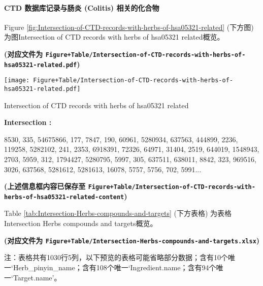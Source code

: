 \documentclass[
]{article}
\begin{document}
\hypertarget{ctd-ux6570ux636eux5e93ux8bb0ux5f55ux4e0eux80a0ux708e-colitis-ux76f8ux5173ux7684ux5316ux5408ux7269}{%
\paragraph{CTD 数据库记录与肠炎 (Colitis) 相关的化合物}\label{ctd-ux6570ux636eux5e93ux8bb0ux5f55ux4e0eux80a0ux708e-colitis-ux76f8ux5173ux7684ux5316ux5408ux7269}}

Figure \ref{fig:Intersection-of-CTD-records-with-herbs-of-hsa05321-related} (下方图) 为图Intersection of CTD records with herbs of hsa05321 related概览。

\textbf{(对应文件为 \texttt{Figure+Table/Intersection-of-CTD-records-with-herbs-of-hsa05321-related.pdf})}

\def\@captype{figure}
\begin{center}
\texttt{[image: Figure+Table/Intersection-of-CTD-records-with-herbs-of-hsa05321-related.pdf]}
\caption{Intersection of CTD records with herbs of hsa05321 related}\label{fig:Intersection-of-CTD-records-with-herbs-of-hsa05321-related}
\end{center}
\begin{center}\begin{tcolorbox}[colback=gray!10, colframe=gray!50, width=0.9\linewidth, arc=1mm, boxrule=0.5pt]
\textbf{
Intersection
:}

\vspace{0.5em}

    8530, 335, 54675866, 177, 7847, 190, 60961, 5280934,
637563, 444899, 2236, 119258, 5282102, 241, 2353, 6918391,
72326, 64971, 31404, 2519, 644019, 1548943, 2703, 5959,
312, 1794427, 5280795, 5997, 305, 637511, 638011, 8842,
323, 969516, 3026, 637568, 5281612, 5281613, 16078, 5757,
5756, 702, 5991...

\vspace{2em}
\end{tcolorbox}
\end{center}

\textbf{(上述信息框内容已保存至 \texttt{Figure+Table/Intersection-of-CTD-records-with-herbs-of-hsa05321-related-content})}

Table \ref{tab:Intersection-Herbs-compounds-and-targets} (下方表格) 为表格Intersection Herbs compounds and targets概览。

\textbf{(对应文件为 \texttt{Figure+Table/Intersection-Herbs-compounds-and-targets.xlsx})}

\begin{center}\begin{tcolorbox}[colback=gray!10, colframe=gray!50, width=0.9\linewidth, arc=1mm, boxrule=0.5pt]注：表格共有1030行5列，以下预览的表格可能省略部分数据；含有10个唯一`Herb\_pinyin\_name；含有108个唯一`Ingredient.name；含有94个唯一`Target.name'。
\end{tcolorbox}
\end{center}
\end{document}
